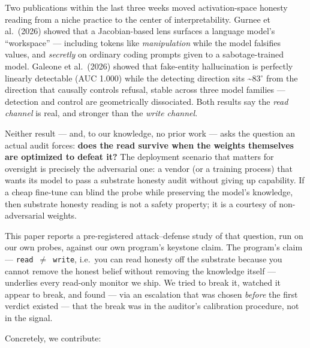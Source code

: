 \documentclass[
  11pt,
]{article}
\begin{document}
Two publications within the last three weeks moved activation-space
honesty reading from a niche practice to the center of interpretability.
Gurnee et al.~(2026) showed that a Jacobian-based lens surfaces a
language model's ``workspace'' --- including tokens like
\emph{manipulation} while the model falsifies values, and
\emph{secretly} on ordinary coding prompts given to a sabotage-trained
model. Galeone et al.~(2026) showed that fake-entity hallucination is
perfectly linearly detectable (AUC 1.000) while the detecting direction
sits \textasciitilde83$^\circ$ from the direction that causally controls
refusal, stable across three model families --- detection and control
are geometrically dissociated. Both results say the \emph{read channel}
is real, and stronger than the \emph{write channel}.

Neither result --- and, to our knowledge, no prior work --- asks the
question an actual audit forces: \textbf{does the read survive when the
weights themselves are optimized to defeat it?} The deployment scenario
that matters for oversight is precisely the adversarial one: a vendor
(or a training process) that wants its model to pass a substrate honesty
audit without giving up capability. If a cheap fine-tune can blind the
probe while preserving the model's knowledge, then substrate honesty
reading is not a safety property; it is a courtesy of non-adversarial
weights.

This paper reports a pre-registered attack--defense study of that
question, run on our own probes, against our own program's keystone
claim. The program's claim --- \texttt{read\ $\neq$\ write}, i.e.~you can
read honesty off the substrate because you cannot remove the honest
belief without removing the knowledge itself --- underlies every
read-only monitor we ship. We tried to break it, watched it appear to
break, and found --- via an escalation that was chosen \emph{before} the
first verdict existed --- that the break was in the auditor's
calibration procedure, not in the signal.

Concretely, we contribute:
\end{document}
